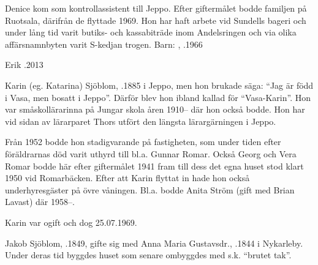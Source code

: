 Denice kom som kontrollassistent till Jeppo. Efter giftermålet bodde familjen på Ruotsala, därifrån de flyttade 1969. Hon har haft arbete vid Sundells bageri och under lång tid varit butiks- och kassabiträde inom Andelsringen och via olika affärsnamnbyten varit S-kedjan trogen.
Barn: , .1966

Erik .2013


Karin (eg. Katarina) Sjöblom, .1885 i Jeppo, men hon brukade säga: ``Jag är född i Vasa, men bosatt i Jeppo''. Därför blev hon ibland kallad för ``Vasa-Karin''. Hon var småskollärarinna på Jungar skola åren 1910-- där hon också bodde. Hon har vid sidan av lärarparet Thors utfört den längsta lärargärningen i Jeppo.

Från 1952 bodde hon stadigvarande på fastigheten, som under tiden efter föräldrarnas död varit uthyrd till bl.a. Gunnar Romar. Också Georg och Vera Romar bodde här efter giftermålet 1941 fram till dess det egna huset stod klart 1950 vid Romarbäcken. Efter att Karin flyttat in hade hon också underhyresgäster på övre våningen. Bl.a. bodde Anita Ström (gift med Brian Lavast) där 1958--.

Karin var ogift och dog 25.07.1969.


Jakob Sjöblom, .1849, gifte sig med Anna Maria Gustavsdr., .1844 i Nykarleby. Under deras tid byggdes huset som senare ombyggdes med s.k. ``brutet tak''.
\begin{jhchildren}
  \item {}
  \item {}
  \item {}
  \item {}
  \item {}
  \item {}
  \item {}
\end{jhchildren}

